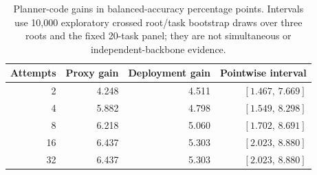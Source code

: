 \begin{table}[t]\centering\small
\begin{tabular}{rrrr}\toprule
Attempts & Proxy gain & Deployment gain & Pointwise interval \\
\midrule
2 & 4.248 & 4.511 & $[1.467,\,7.669]$ \\
4 & 5.882 & 4.798 & $[1.549,\,8.298]$ \\
8 & 6.218 & 5.060 & $[1.702,\,8.691]$ \\
16 & 6.437 & 5.303 & $[2.023,\,8.880]$ \\
32 & 6.437 & 5.303 & $[2.023,\,8.880]$ \\
\bottomrule\end{tabular}
\caption{Planner-code gains in balanced-accuracy percentage points. Intervals use 10,000 exploratory crossed root/task bootstrap draws over three roots and the fixed 20-task panel; they are not simultaneous or independent-backbone evidence.}\label{tab:planner}
\end{table}

